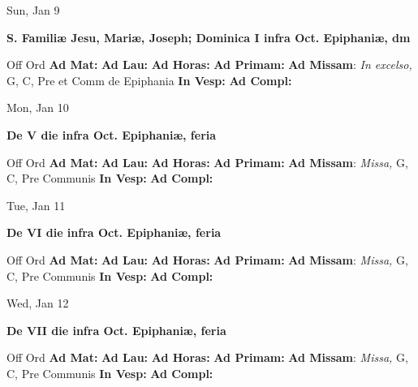 \documentclass[10pt]{article}
\begin{document}
\begin{minipage}{3.5in}
\vspace{2em}\begin{center}
Sun, Jan 9
\end{center}\textbf{ \large S. Familiæ Jesu, Mariæ, Joseph; Dominica I infra Oct. Epiphaniæ, \textnormal{\normalsize dm}}
\begin{justify}
Off Ord
\textbf{Ad Mat: }
\textbf{Ad Lau: }
\textbf{Ad Horas: }
\textbf{Ad Primam: }
\textbf{Ad Missam}: \textit{In excelso,} G, C, Pre et Comm de Epiphania
\textbf{In Vesp: }
\textbf{Ad Compl: }\end{justify}
\end{minipage}



\begin{minipage}{3.5in}
\vspace{2em}\begin{center}
Mon, Jan 10
\end{center}\textbf{ \large De V die infra Oct. Epiphaniæ, \textnormal{\normalsize feria}}
\begin{justify}
Off Ord
\textbf{Ad Mat: }
\textbf{Ad Lau: }
\textbf{Ad Horas: }
\textbf{Ad Primam: }
\textbf{Ad Missam}: \textit{Missa,} G, C, Pre Communis
\textbf{In Vesp: }
\textbf{Ad Compl: }\end{justify}
\end{minipage}



\begin{minipage}{3.5in}
\vspace{2em}\begin{center}
Tue, Jan 11
\end{center}\textbf{ \large De VI die infra Oct. Epiphaniæ, \textnormal{\normalsize feria}}
\begin{justify}
Off Ord
\textbf{Ad Mat: }
\textbf{Ad Lau: }
\textbf{Ad Horas: }
\textbf{Ad Primam: }
\textbf{Ad Missam}: \textit{Missa,} G, C, Pre Communis
\textbf{In Vesp: }
\textbf{Ad Compl: }\end{justify}
\end{minipage}



\begin{minipage}{3.5in}
\vspace{2em}\begin{center}
Wed, Jan 12
\end{center}\textbf{ \large De VII die infra Oct. Epiphaniæ, \textnormal{\normalsize feria}}
\begin{justify}
Off Ord
\textbf{Ad Mat: }
\textbf{Ad Lau: }
\textbf{Ad Horas: }
\textbf{Ad Primam: }
\textbf{Ad Missam}: \textit{Missa,} G, C, Pre Communis
\textbf{In Vesp: }
\textbf{Ad Compl: }\end{justify}
\end{minipage}
\end{document}
